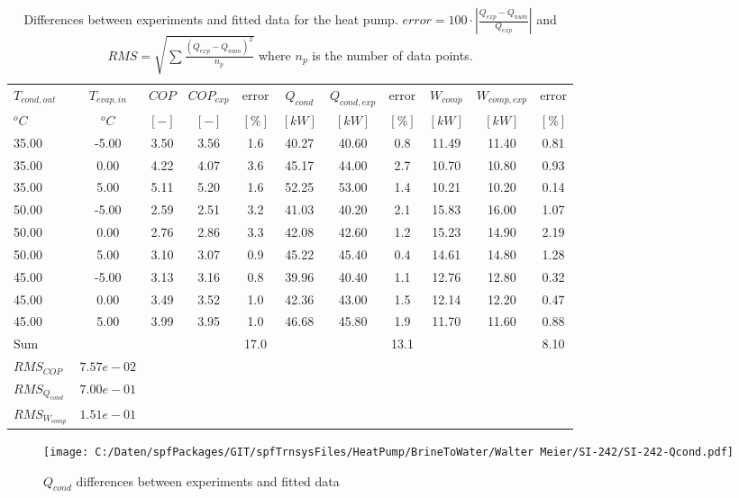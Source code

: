 \documentclass[english]{SPFShortReport}
\begin{document}
\begin{table}[!ht]
\begin{small}
\caption{Differences between experiments and fitted data for the heat pump.          $error=100 \cdot |\frac{Q_{exp}-Q_{num}}{Q_{exp}}|$ and $RMS = \sqrt { \sum{\frac{(Q_{exp}-Q_{num})^2}{n_p}} }$ where $n_p$ is the number of data points.}
\begin{center}
\resizebox{12cm}{!} 
{
\begin{tabular}{l | c c c c c c c c c c } 
\hline
\hline
$T_{cond,out}$ &$T_{evap,in}$ &$COP$ &$COP_{exp}$ &error &$Q_{cond}$ &$Q_{cond,exp}$ &error &$W_{comp}$ &$W_{comp,exp}$ &error \\ 
$^oC$ &$^oC$ &$[-]$ &$[-]$ &$[\%]$ &$[kW]$ &$[kW]$ &$[\%]$ &$[kW]$ &$[kW]$ &$[\%]$\\ 
\hline
35.00  & -5.00 & 3.50 & 3.56 & 1.6 & 40.27 & 40.60 & 0.8 & 11.49 & 11.40 & 0.81\\ 
35.00  & 0.00 & 4.22 & 4.07 & 3.6 & 45.17 & 44.00 & 2.7 & 10.70 & 10.80 & 0.93\\ 
35.00  & 5.00 & 5.11 & 5.20 & 1.6 & 52.25 & 53.00 & 1.4 & 10.21 & 10.20 & 0.14\\ 
50.00  & -5.00 & 2.59 & 2.51 & 3.2 & 41.03 & 40.20 & 2.1 & 15.83 & 16.00 & 1.07\\ 
50.00  & 0.00 & 2.76 & 2.86 & 3.3 & 42.08 & 42.60 & 1.2 & 15.23 & 14.90 & 2.19\\ 
50.00  & 5.00 & 3.10 & 3.07 & 0.9 & 45.22 & 45.40 & 0.4 & 14.61 & 14.80 & 1.28\\ 
45.00  & -5.00 & 3.13 & 3.16 & 0.8 & 39.96 & 40.40 & 1.1 & 12.76 & 12.80 & 0.32\\ 
45.00  & 0.00 & 3.49 & 3.52 & 1.0 & 42.36 & 43.00 & 1.5 & 12.14 & 12.20 & 0.47\\ 
45.00  & 5.00 & 3.99 & 3.95 & 1.0 & 46.68 & 45.80 & 1.9 & 11.70 & 11.60 & 0.88\\ 
\hline 
 Sum &  & &  & 17.0 &  &  & 13.1 & &  & 8.10\\ 
\hline 
 $RMS_{COP}$ & $7.57e-02$ \\ 
 $RMS_{Q_{cond}}$ & $7.00e-01$ \\ 
 $RMS_{W_{comp}}$ & $1.51e-01$ \\ 
\hline
\hline
\end{tabular}
}
\label{ErrorsTable}
\end{center}
\end{small}
\end{table}
\begin{figure}[!ht]
\begin{center}
\texttt{[image: C:/Daten/spfPackages/GIT/spfTrnsysFiles/HeatPump/BrineToWater/Walter Meier/SI-242/SI-242-Qcond.pdf]}
\caption{$Q_{cond}$ differences between experiments and fitted data}
\label{QcongFig}
\end{center}
\end{figure}
\end{document}
